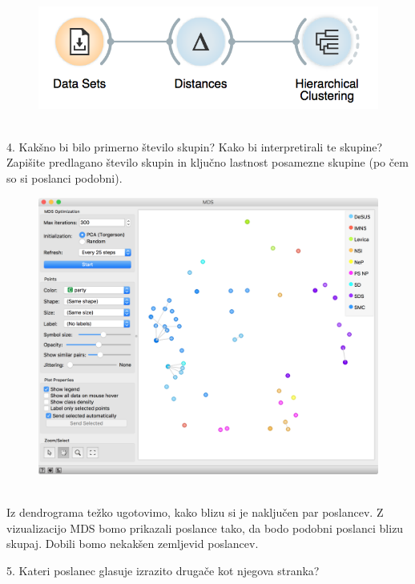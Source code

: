 \begin{figure}[h]
    \includegraphics[scale=0.6]{workflow2.png}
    \caption{$\;$}
\end{figure}

4. Kakšno bi bilo primerno število skupin? Kako bi interpretirali te skupine? Zapišite predlagano število skupin in ključno lastnost posamezne skupine (po čem so si poslanci podobni).

\hspace{1cm}

\begin{figure}
    \includegraphics[scale=0.35]{mds.png}
    \caption{$\;$}
\end{figure}

Iz dendrograma težko ugotovimo, kako blizu si je naključen par poslancev. Z vizualizacijo MDS bomo prikazali poslance tako, da bodo podobni poslanci blizu skupaj. Dobili bomo nekakšen zemljevid poslancev.

\hspace{1cm}

5. Kateri poslanec glasuje izrazito drugače kot njegova stranka?
